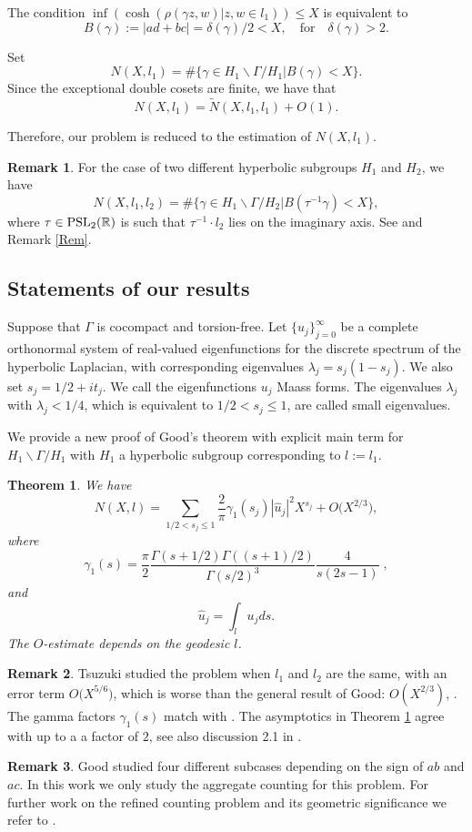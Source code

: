 \documentclass[a4paper,11pt]{amsart}
\newtheorem{theorem}{Theorem}[section]
\theoremstyle{definition}
\newtheorem{remark}{Remark}
\begin{document}
The condition $\inf(\cosh({ \rho} (\gamma z,w)| {{z, w\in l_1}}))\le X$ is equivalent to $$B(\gamma):= |ad+bc| =\delta(\gamma)/2<X, \quad \text{for} \quad \delta(\gamma)>2.$$ 

Set
$$N(X,l_1)= \# \Big\{\gamma \in  H_1\backslash \Gamma /H_1 | B(\gamma)<X \Big\}.$$
Since the exceptional double cosets are finite, we have that $$N(X,l_1)=\widetilde{N}(X,l_1,l_1)+O(1).$$

Therefore, our problem is reduced to the estimation of $N(X,l_1)$.\\
\begin{remark} For the case of two different hyperbolic subgroups $H_1$ and $H_2$, 
we have $$N(X,l_1,l_2)= \# \Big\{\gamma \in  H_1\backslash \Gamma /H_2 | B(\tau^{-1} \gamma)<X \Big\},$$
where $\tau \in \hbox{PSL}_2(\mathbb{R})$ is such that $\tau^{-1} \cdot l_2$ lies on the imaginary axis. See 
\cite[Ch. 6]{MMW} and Remark \ref{Rem}.
    \end{remark}




\subsection{Statements of our results}
Suppose that $\Gamma$ is cocompact and torsion-free. Let $\{u_j\}_{j=0}^{\infty}$ be a complete orthonormal system of real-valued eigenfunctions for the discrete spectrum of the hyperbolic Laplacian, with corresponding eigenvalues $\lambda_j=s_j(1-s_j)$. We also set $s_j=1/2+it_j$. We call the eigenfunctions $u_j$ Maass forms. The eigenvalues $\lambda_j$ with $\lambda_j<1/4$, which is equivalent to $ 1/2<s_j\le 1$, are called small eigenvalues.  

We provide a new proof of Good's theorem \cite[Th. 4]{Good} with explicit main term for $H_1 \backslash \Gamma / H_1$ with $H_1$ a hyperbolic subgroup corresponding to $l:=l_1$.
\begin{theorem}\label{mainthm}
We have
$$N(X,l)= \sum_{1/2<s_j\le1}\frac{2}{\pi}\gamma_1(s_j)|\hat{u}_j|^2X^{s_j}+O\big(X^{2/3}\big),$$
where $$\gamma_1(s)=\frac{\pi}{2}\frac{\Gamma(s+1/2)\Gamma((s+1)/2)}{\Gamma(s/2)^3}\frac{4}{s(2s-1)} \; ,$$
and $$\hat{u}_j=\int_lu_jds.$$ The $O$-estimate depends on the geodesic $l$.
\end{theorem}
\begin{remark}
    Tsuzuki \cite{Tsuz} studied the problem when $l_1$ and $l_2$ are the same, with an error term $O\big(X^{5/6}\big)$, which is worse than the general result of Good: $O(X^{2/3})$, \cite[Th. 4]{Good}.
 The gamma factors $\gamma_1(s)$ match with \cite[Th. 25]{Tsuz}. The asymptotics in Theorem \ref{mainthm} agree with \cite[Th. 25]{Tsuz} up to a  a factor of $2$, see also discussion 2.1 in \cite{Tsuz}. 
\end{remark}
\begin{remark}
    Good \cite{Good} studied four different subcases depending on the sign of $ab$ and $ac$. In this work we only study the aggregate counting for this problem. For further work on the refined counting problem and its geometric significance we refer to \cite{Voskou}.
\end{remark}
\end{document}
